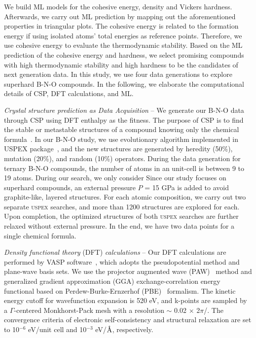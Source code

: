 	We build ML models for the cohesive energy, density and Vickers hardness. Afterwards, we carry out ML prediction by mapping out the aforementioned properties in triangular plots. The cohesive energy is related to the formation energy if using isolated atoms' total energies as reference points. Therefore, we use cohesive energy to evaluate the thermodynamic stability. Based on the ML prediction of the cohesive energy and hardness, we select promising compounds with high thermodynamic stability and high hardness to be the candidates of next generation data. In this study, we use four data generations to explore superhard B-N-O compounds. In the following, we elaborate the computational details of CSP, DFT calculations, and ML.
	
	{\it Crystal structure prediction as Data Acquisition}  --
	We generate our B-N-O data through CSP using DFT enthalpy as the fitness. The purpose of CSP is to find the stable or metastable structures of a compound knowing only the chemical formula~\cite{wang2014perspective,graser2018machine, oganov2019structure}. In our B-N-O study, we use evolutionary algorithm implemented in USPEX package~\cite{oganov2006crystal, glass2006uspex, lyakhov2013new}, and the new structures are generated by heredity (50\%), mutation (20\%), and random (10\%) operators. During the data generation for ternary B-N-O compounds, the number of atoms in an unit-cell is between 9 to 19 atoms. During our search, we only consider Since our study focuses on superhard compounds, an external pressure $P$ = 15 GPa is added to avoid graphite-like, layered structures. For each atomic composition, we carry out two separate \textsc{uspex} searches, and more than 1200 structures are explored for each. Upon completion, the optimized structures of both \textsc{uspex} searches are further relaxed without external pressure. In the end, we have two data points for a single chemical formula.
	
	{\it Density functional theory} (DFT) {\it calculations} --
	Our DFT calculations are performed by VASP software~\cite{kresse1996efficiency,kresse1996efficient}, which adopts the pseudopotential method and plane-wave basis sets. We use the projector augmented wave (PAW)~\cite{PAW_1,PAW_2} method and generalized gradient approximation (GGA) exchange-correlation energy functional based on Perdew-Burke-Ernzerhof (PBE)~\cite{PBE} formalism. The kinetic energy cutoff for wavefunction expansion is 520 eV, and k-points are sampled by a $\Gamma$-centered Monkhorst-Pack mesh with a resolution $\sim$ 0.02 $\times$ 2$\pi$/\text{\normalfont\AA}. The convergence criteria of electronic self-consistency and structural relaxation are set to 10$^{-6}$
	eV/unit cell and 10$^{-3}$ eV/$\text{\normalfont\AA}$, respectively. 
	
